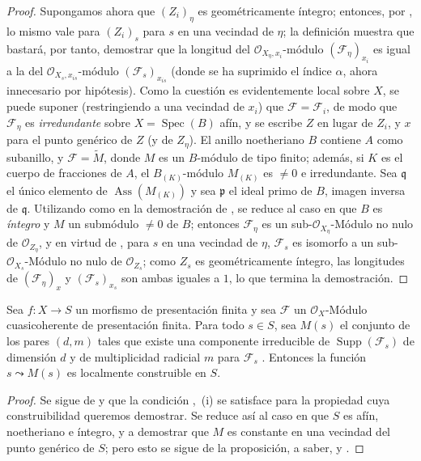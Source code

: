 \begin{proof}
Supongamos ahora que $(Z_i)_\eta$ es geométricamente íntegro; entonces, por , lo mismo vale para $(Z_i)_s$ para $s$ en una vecindad de $\eta$; la definición  muestra que bastará, por tanto, demostrar que la longitud del $\mathcal O_{X_\eta,x_i}$-módulo $(\mathcal F_\eta)_{x_i}$ es igual a la del $\mathcal O_{X_s,x_{is}}$-módulo $(\mathcal F_s)_{x_{is}}$ (donde se ha suprimido el índice $\alpha$, ahora innecesario por hipótesis).
Como la cuestión es evidentemente local sobre $X$, se puede suponer (restringiendo a una vecindad de $x_i$) que $\mathcal F=\mathcal F_i$, de modo que $\mathcal F_\eta$ es \emph{irredundante} sobre $X=\operatorname{Spec}(B)$ afín, y se escribe $Z$ en lugar de $Z_i$, y $x$ para el punto genérico de $Z$ (y de $Z_\eta$).
El anillo noetheriano $B$ contiene $A$ como subanillo, y $\mathcal F=\widetilde M$, donde $M$ es un $B$-módulo de tipo finito; además, si $K$ es el cuerpo de fracciones de $A$, el $B_{(K)}$-módulo $M_{(K)}$ es $\neq0$ e irredundante.
Sea $\mathfrak q$ el único elemento de $\operatorname{Ass}(M_{(K)})$ y sea $\mathfrak p$ el ideal primo de $B$, imagen inversa de $\mathfrak q$.
Utilizando  como en la demostración de , se reduce al caso en que $B$ es \emph{íntegro} y $M$ un submódulo $\neq0$ de $B$; entonces $\mathcal F_\eta$ es un sub-$\mathcal O_{X_\eta}$-Módulo no nulo de $\mathcal O_{Z_\eta}$, y en virtud de , para $s$ en una vecindad de $\eta$, $\mathcal F_s$ es isomorfo a un sub-$\mathcal O_{X_s}$-Módulo no nulo de $\mathcal O_{Z_s}$; como $Z_s$ es geométricamente íntegro, las longitudes de $(\mathcal F_\eta)_x$ y $(\mathcal F_s)_{x_s}$ son ambas iguales a $1$, lo que termina la demostración.
\end{proof}


\begin{corollary}[9.8.7]
\label{IV.9.8.7}

Sea $f:X\to S$ un morfismo de presentación finita y sea $\mathcal F$ un $\mathcal O_X$-Módulo cuasicoherente de presentación finita.
Para todo $s\in S$, sea $M(s)$ el conjunto de los pares $(d,m)$ tales que existe una componente irreducible de $\operatorname{Supp}(\mathcal F_s)$ de dimensión $d$ y de multiplicidad radicial $m$ para $\mathcal F_s$ .
Entonces la función $s\leadsto M(s)$ es localmente construible en $S$.
\end{corollary}

\begin{proof}
\label{IV.9.8.7-proof}
Se sigue de  y  que la condición ,~(i) se satisface para la propiedad cuya construibilidad queremos demostrar.
Se reduce así al caso en que $S$ es afín, noetheriano e íntegro, y a demostrar que $M$ es constante en una vecindad del punto genérico de $S$; pero esto se sigue de la proposición, a saber,  y .
\end{proof}

